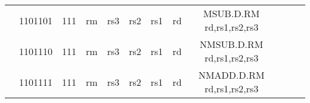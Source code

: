 \begin{table}[p]
\begin{small}
\begin{center}
\begin{tabular}{rcccccccccccl}
&
\multicolumn{1}{|c|}{1101101} &
\multicolumn{1}{c|}{111} &
\multicolumn{1}{c|}{rm} &
\multicolumn{2}{c|}{rs3} &
\multicolumn{1}{c|}{rs2} &
\multicolumn{1}{c|}{rs1} &
\multicolumn{1}{c|}{rd} & MSUB.D.RM rd,rs1,rs2,rs3 \\
\cline{2-9}
  

&
\multicolumn{1}{|c|}{1101110} &
\multicolumn{1}{c|}{111} &
\multicolumn{1}{c|}{rm} &
\multicolumn{2}{c|}{rs3} &
\multicolumn{1}{c|}{rs2} &
\multicolumn{1}{c|}{rs1} &
\multicolumn{1}{c|}{rd} & NMSUB.D.RM rd,rs1,rs2,rs3 \\
\cline{2-9}
  

&
\multicolumn{1}{|c|}{1101111} &
\multicolumn{1}{c|}{111} &
\multicolumn{1}{c|}{rm} &
\multicolumn{2}{c|}{rs3} &
\multicolumn{1}{c|}{rs2} &
\multicolumn{1}{c|}{rs1} &
\multicolumn{1}{c|}{rd} & NMADD.D.RM rd,rs1,rs2,rs3 \\
\cline{2-9}
  

\end{tabular}
\end{center}
\end{small}

\label{instr-table}
\end{table}
  

\newpage

